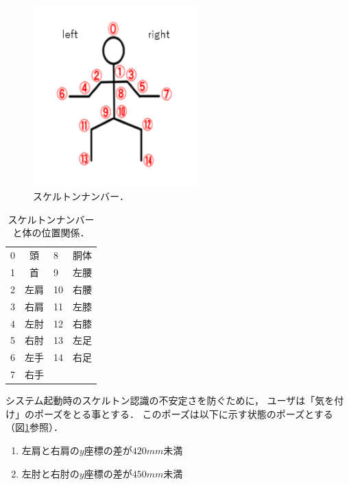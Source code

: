 \begin{figure}[htbp]
    \centering
    \includegraphics[height=7cm]{image/Skeleton_num.png}
    \caption[スケルトンナンバー]{スケルトンナンバー．}
  \label{num}
\end{figure}

\vspace{1cm}

\begin{table}[h]
    \centering
    \begin{tabular}{|lc|lc|} \hline
      0 & 頭 & 8 & 胴体 \\ 
      1 & 首 & 9 & 左腰 \\
      2 & 左肩 & 10 & 右腰 \\
      3 & 右肩 & 11 & 左膝 \\
      4 & 左肘 & 12 & 右膝 \\
      5 & 右肘 & 13 & 左足 \\
      6 & 左手 & 14 & 右足 \\
      7 & 右手 &  &  \\ \hline
    \end{tabular}
    \caption[スケルトンナンバーと体の位置関係]{スケルトンナンバーと体の位置関係．}
    \label{numtable}
\end{table}

\clearpage

システム起動時のスケルトン認識の不安定さを防ぐために，
ユーザは「気を付け」のポーズをとる事とする．
このポーズは以下に示す状態のポーズとする（図\ref{num}参照）．


\begin{enumerate}
    \item 左肩と右肩の$y$座標の差が$420mm$未満
    \item 左肘と右肘の$y$座標の差が$450mm$未満
\end{enumerate}

